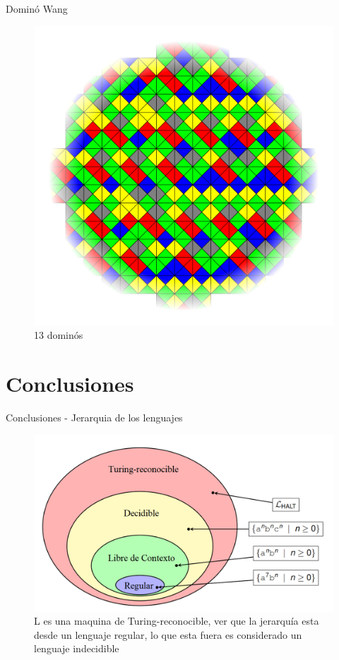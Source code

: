 \documentclass[11pt]{beamer}
\begin{document}
		 \begin{frame}{ Dominó Wang}
			\justifying
			
			\begin{figure}[H]
				\centering
				\includegraphics[scale=0.2]{img/Wangtess.png}
				\caption{13 dominós}
				\label{fig: wang13}
			\end{figure}
			
			
		 \end{frame}
		
		
		
	
	
	\section{Conclusiones}
		\begin{frame}{Conclusiones - Jerarquia de los lenguajes}
			\justifying
			\begin{figure}[H]
				\centering
				\includegraphics[scale=0.35]{img/jerarquiaLenguajes.PNG}
				\caption{L es una maquina de Turing-reconocible, ver que la jerarquía esta desde un lenguaje regular, lo que esta fuera es considerado un lenguaje indecidible}
				\label{fig: jeraquiaLenguajes}
			\end{figure}
		\end{frame}
		
\end{document}
